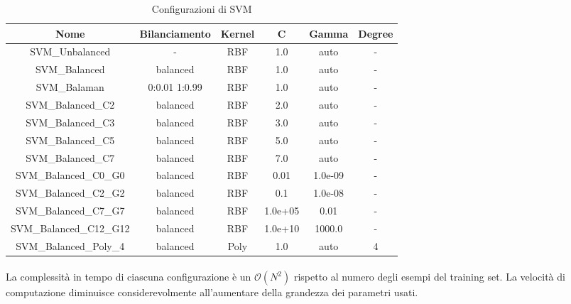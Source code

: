 \documentclass[12pt,a4paper,oneside,hidelinks]{report}
\begin{document}
\begin{table}[ht]%
\centering
\caption{Configurazioni di SVM}\label{tab:b1}
\begin{tabular}{|c|c|c|S[table-parse-only = true]|S[table-parse-only = true]|c|}
\hline
Nome                    & Bilanciamento & Kernel & C        & Gamma & Degree    \\ 
\hline 
SVM\_Unbalanced         & -             & RBF    & 1.0      & auto    & -       \\
\hline 
SVM\_Balanced           & balanced      & RBF    & 1.0      & auto    & -       \\
\hline 
SVM\_Balaman            & 0:0.01 1:0.99 & RBF    & 1.0      & auto    & -       \\
\hline 
SVM\_Balanced\_C2       & balanced      & RBF    & 2.0      & auto    & -       \\
\hline 
SVM\_Balanced\_C3       & balanced      & RBF    & 3.0      & auto    & -       \\
\hline 
SVM\_Balanced\_C5       & balanced      & RBF    & 5.0      & auto    & -       \\
\hline 
SVM\_Balanced\_C7       & balanced      & RBF    & 7.0      & auto    & -       \\
\hline 
SVM\_Balanced\_C0\_G0   & balanced      & RBF    & 0.01     & 1.0e-09 & -       \\
\hline 
SVM\_Balanced\_C2\_G2   & balanced      & RBF    & 0.1      & 1.0e-08 & -       \\
\hline 
SVM\_Balanced\_C7\_G7   & balanced      & RBF    & 1.0e+05  & 0.01    & -       \\
\hline 
SVM\_Balanced\_C12\_G12 & balanced      & RBF    & 1.0e+10  & 1000.0  & -       \\
\hline 
SVM\_Balanced\_Poly\_4  & balanced      & Poly   & 1.0      & auto    & 4       \\
\hline 
\end{tabular} 
\end{table}

\paragraph*{}
La complessità in tempo di ciascuna configurazione è un $\mathcal{O}(N^2)$ rispetto al numero degli esempi del training set. La velocità di computazione diminuisce considerevolmente all'aumentare della grandezza dei parametri usati.
\end{document}
